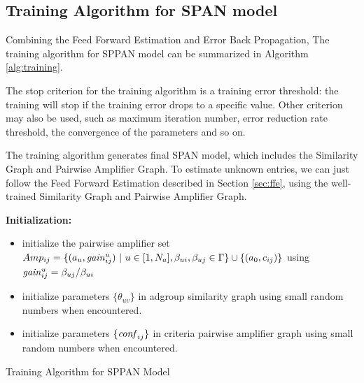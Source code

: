 \documentclass[conference,compsoc]{IEEEtran}
\begin{document}
\subsection{Training Algorithm for SPAN model}
Combining the Feed Forward Estimation and Error Back Propagation, The training algorithm for SPPAN model can be summarized in Algorithm \ref{alg:training}.

The stop criterion for the training algorithm  is a training error threshold: the training will stop if the training error drops to a specific value. Other criterion may also be used, such as maximum iteration number\cite{?}, error reduction rate threshold\cite{?}, the convergence of the parameters\cite{?} and so on.

The training algorithm generates final SPAN model, which includes the Similarity Graph and Pairwise Amplifier Graph. To estimate unknown entries, we can just follow the Feed Forward Estimation described in Section \ref{sec:ffe}, using the well-trained Similarity Graph and Pairwise Amplifier Graph.


\begin{algorithm}
  \textbf{Initialization:}\\
  \begin{itemize}
  \item initialize the pairwise amplifier set
    $Amp_{ij}=\{(a_u,\mathit{gain}^{u}_{ij})~|~u\in
    [1,N_a],\beta_{ui},\beta_{uj}\in \Gamma\} \cup \{(a_0,c_{ij})\}$
    using $\mathit{gain}^{u}_{ij}=\beta_{uj}/\beta_{ui}$
  \item initialize parameters $\{\theta_{uv}\}$ in adgroup similarity
    graph using small random numbers when encountered.
  \item initialize parameters $\{\mathit{conf}_{ij}\}$ in criteria pairwise
    amplifier graph using small random numbers when encountered.
  \end{itemize}
  \caption{Training Algorithm for SPPAN Model}
  \label{alg:training}
\end{algorithm}
\end{document}
